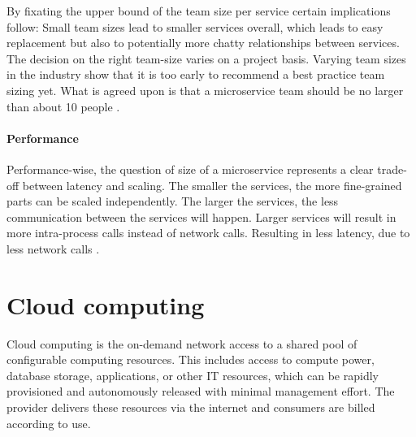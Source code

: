 By fixating the upper bound of the team size per service certain implications follow:
Small team sizes lead to smaller services overall, which leads to easy replacement but also to potentially more chatty relationships between services.
The decision on the right team-size varies on a project basis.
Varying team sizes in the industry show that it is too early to recommend a best practice team sizing yet.
What is agreed upon is that a microservice team should be no larger than about 10 people \citep[p. 34]{Wolff2016}.

\paragraph{Performance}
\label{bac:sizingPerformance}
Performance-wise, the question of size of a microservice represents a clear trade-off between latency and scaling.
The smaller the services, the more fine-grained parts can be scaled independently.
The larger the services, the less communication between the services will happen.
Larger services will result in more intra-process calls instead of network calls.
Resulting in less latency, due to less network calls \citep[p. 32]{Wolff2016}.

\clearpage

\section{Cloud computing}
\label{bac:cc}
Cloud computing is the on-demand network access to a shared pool of configurable computing resources.
This includes access to compute power, database storage, applications, or other IT resources, which can be rapidly provisioned and autonomously released with minimal management effort.
The provider delivers these resources via the internet and consumers are billed according to use.
\citep[p. 2]{DefCC2011} \cite[p. 17]{Hassan2014}

